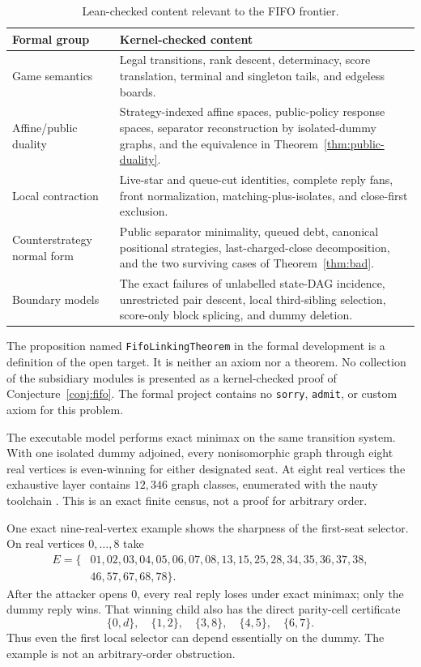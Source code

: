 \documentclass[11pt]{article}
\theoremstyle{definition}
\theoremstyle{remark}
\begin{document}
\begin{table}[ht]
\centering
\small
\begin{tabular}{p{}p{}}
\hline
Formal group & Kernel-checked content \\
\hline
Game semantics & Legal transitions, rank descent, determinacy, score
translation, terminal and singleton tails, and edgeless boards. \\
Affine/public duality & Strategy-indexed affine spaces, public-policy
response spaces, separator reconstruction by isolated-dummy graphs, and the
equivalence in Theorem~\ref{thm:public-duality}. \\
Local contraction & Live-star and queue-cut identities, complete reply fans,
front normalization, matching-plus-isolates, and close-first exclusion. \\
Counterstrategy normal form & Public separator minimality, queued debt,
canonical positional strategies, last-charged-close decomposition, and the
two surviving cases of Theorem~\ref{thm:bad}. \\
Boundary models & The exact failures of unlabelled state-DAG incidence,
unrestricted pair descent, local third-sibling selection, score-only block
splicing, and dummy deletion. \\
\hline
\end{tabular}
\caption{Lean-checked content relevant to the FIFO frontier.}
\label{tab:formal}
\end{table}

The proposition named \texttt{FifoLinkingTheorem} in the formal development
is a definition of the open target.  It is neither an axiom nor a theorem.
No collection of the subsidiary modules is presented as a kernel-checked
proof of Conjecture~\ref{conj:fifo}.  The formal project contains no
\texttt{sorry}, \texttt{admit}, or custom axiom for this problem.

The executable model performs exact minimax on the same transition system.
With one isolated dummy adjoined, every nonisomorphic graph through eight
real vertices is even-winning for either designated seat.  At eight real
vertices the exhaustive layer contains $12{,}346$ graph classes, enumerated
with the nauty toolchain \cite{mckaypiperno2014}.  This is an exact finite
census, not a proof for arbitrary order.

One exact nine-real-vertex example shows the sharpness of the first-seat
selector.  On real vertices $0,\ldots,8$ take
\[
\begin{split}
E=\{&01,02,03,04,05,06,07,08,13,15,25,28,34,35,36,37,38,\\
    &46,57,67,68,78\}.
\end{split}
\]
After the attacker opens $0$, every real reply loses under exact minimax;
only the dummy reply wins.  That winning child also has the direct parity-cell
certificate
\[
  \{0,d\},\quad\{1,2\},\quad\{3,8\},\quad\{4,5\},\quad\{6,7\}.
\]
Thus even the first local selector can depend essentially on the dummy.  The
example is not an arbitrary-order obstruction.
\end{document}
